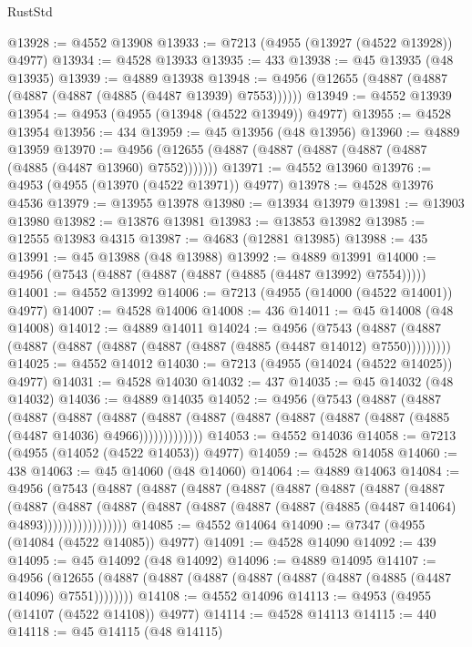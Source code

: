 \begin{lexlean}{RustStd}
\begin{coremodule}
@13928 := @4552 @13908
@13933 := @7213 (@4955 (@13927 (@4522 @13928)) @4977)
@13934 := @4528 @13933
@13935 := 433
@13938 := @45 @13935 (@48 @13935)
@13939 := @4889 @13938
@13948 := @4956 (@12655 (@4887 (@4887 (@4887 (@4887 (@4885 (@4487 @13939) @7553))))))
@13949 := @4552 @13939
@13954 := @4953 (@4955 (@13948 (@4522 @13949)) @4977)
@13955 := @4528 @13954
@13956 := 434
@13959 := @45 @13956 (@48 @13956)
@13960 := @4889 @13959
@13970 := @4956 (@12655 (@4887 (@4887 (@4887 (@4887 (@4887 (@4885 (@4487 @13960) @7552)))))))
@13971 := @4552 @13960
@13976 := @4953 (@4955 (@13970 (@4522 @13971)) @4977)
@13978 := @4528 @13976 @4536
@13979 := @13955 @13978
@13980 := @13934 @13979
@13981 := @13903 @13980
@13982 := @13876 @13981
@13983 := @13853 @13982
@13985 := @12555 @13983 @4315
@13987 := @4683 (@12881 @13985)
@13988 := 435
@13991 := @45 @13988 (@48 @13988)
@13992 := @4889 @13991
@14000 := @4956 (@7543 (@4887 (@4887 (@4887 (@4885 (@4487 @13992) @7554)))))
@14001 := @4552 @13992
@14006 := @7213 (@4955 (@14000 (@4522 @14001)) @4977)
@14007 := @4528 @14006
@14008 := 436
@14011 := @45 @14008 (@48 @14008)
@14012 := @4889 @14011
@14024 := @4956
    (@7543 (@4887 (@4887 (@4887 (@4887 (@4887 (@4887 (@4887 (@4885 (@4487 @14012) @7550)))))))))
@14025 := @4552 @14012
@14030 := @7213 (@4955 (@14024 (@4522 @14025)) @4977)
@14031 := @4528 @14030
@14032 := 437
@14035 := @45 @14032 (@48 @14032)
@14036 := @4889 @14035
@14052 := @4956
    (@7543
      (@4887
        (@4887
          (@4887
            (@4887
              (@4887
                (@4887 (@4887 (@4887 (@4887 (@4887 (@4887 (@4885 (@4487 @14036) @4966)))))))))))))
@14053 := @4552 @14036
@14058 := @7213 (@4955 (@14052 (@4522 @14053)) @4977)
@14059 := @4528 @14058
@14060 := 438
@14063 := @45 @14060 (@48 @14060)
@14064 := @4889 @14063
@14084 := @4956
    (@7543
      (@4887
        (@4887
          (@4887
            (@4887
              (@4887
                (@4887
                  (@4887
                    (@4887
                      (@4887
                        (@4887
                          (@4887
                            (@4887 (@4887 (@4887 (@4887 (@4885 (@4487 @14064) @4893)))))))))))))))))
@14085 := @4552 @14064
@14090 := @7347 (@4955 (@14084 (@4522 @14085)) @4977)
@14091 := @4528 @14090
@14092 := 439
@14095 := @45 @14092 (@48 @14092)
@14096 := @4889 @14095
@14107 := @4956
    (@12655 (@4887 (@4887 (@4887 (@4887 (@4887 (@4887 (@4885 (@4487 @14096) @7551))))))))
@14108 := @4552 @14096
@14113 := @4953 (@4955 (@14107 (@4522 @14108)) @4977)
@14114 := @4528 @14113
@14115 := 440
@14118 := @45 @14115 (@48 @14115)

\end{coremodule}
\end{lexlean}
